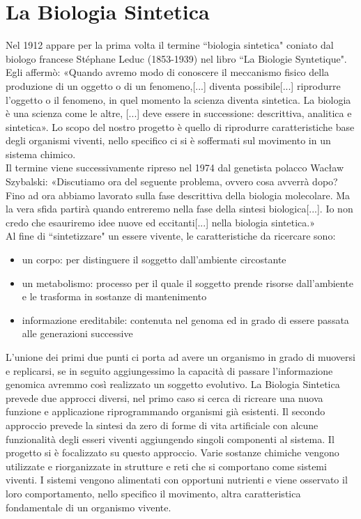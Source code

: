 \section{La Biologia Sintetica}
\label{sec:artificial}
Nel 1912 appare per la prima volta il termine ``biologia sintetica" coniato dal biologo francese Stéphane Leduc (1853-1939) nel libro ``La Biologie Syntetique". Egli affermò: «Quando avremo modo di conoscere il meccanismo fisico della produzione di un oggetto o di un fenomeno,[...] diventa possibile[...] riprodurre l'oggetto o il fenomeno, in quel momento la scienza diventa sintetica. La biologia è una scienza come le altre, [...] deve essere in successione: descrittiva, analitica e sintetica». 
Lo scopo del nostro progetto è  quello di riprodurre caratteristiche base degli organismi viventi, nello specifico ci si è soffermati sul movimento in un sistema chimico.
\\Il termine viene successivamente ripreso nel 1974 dal genetista polacco Wacław Szybalski: «Discutiamo ora del seguente problema, ovvero cosa avverrà dopo? Fino ad ora abbiamo lavorato sulla fase descrittiva della biologia molecolare. Ma la vera sfida partirà quando entreremo nella fase della sintesi biologica[...]. Io non credo che esauriremo idee nuove ed eccitanti[...] nella biologia sintetica.» \cite{waclaw} 
\\Al fine di ``sintetizzare" un essere vivente, le caratteristiche da ricercare sono:
\begin{itemize}
\item un corpo: per distinguere il soggetto dall'ambiente circostante
\item un metabolismo: processo per il quale il soggetto prende risorse dall'ambiente e le trasforma in sostanze di mantenimento
\item informazione ereditabile: contenuta nel genoma ed in grado di essere passata alle generazioni successive
\end{itemize}
L'unione dei primi due punti ci porta ad avere un organismo in grado di muoversi e replicarsi, se in seguito aggiungessimo la capacità di passare l'informazione genomica avremmo così realizzato un soggetto evolutivo. La Biologia Sintetica prevede due approcci diversi, nel primo caso si cerca di ricreare una nuova funzione e applicazione riprogrammando organismi già esistenti. Il secondo approccio prevede la sintesi da zero di forme di vita artificiale con alcune funzionalità degli esseri viventi aggiungendo singoli componenti al sistema. Il progetto si è focalizzato su questo approccio. Varie sostanze chimiche vengono utilizzate e riorganizzate in strutture e reti che si comportano come sistemi viventi. I sistemi vengono alimentati con opportuni nutrienti e viene osservato il loro comportamento, nello specifico il movimento, altra caratteristica fondamentale di un organismo vivente.
\pagebreak
